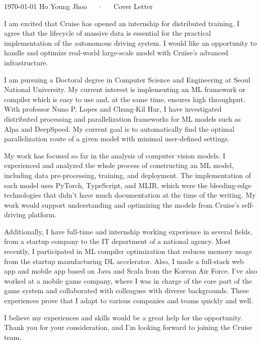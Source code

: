 \documentclass[11pt, a4paper]{awesome-cv}
\begin{document}
\makecvheader[L]

\makecvfooter
{\today}
{Ho Young Jhoo~~~·~~~Cover Letter}
{}

\makelettertitle

\begin{cvletter}

  I am excited that Cruise has opened an internship for distributed training. I agree that the lifecycle of massive data is essential for the practical implementation of the autonomous driving system. I would like an opportunity to handle and optimize real-world large-scale model with Cruise's advanced infrastructure.

  I am pursuing a Doctoral degree in Computer Science and Engineering at Seoul National University.
  My current interest is implementing an ML framework or compiler which is easy to use and, at the same time, ensures high throughput. With professor Nuno P. Lopes and Chung-Kil Hur, I have investigated distributed processing and parallelization frameworks for ML models such as Alpa and DeepSpeed. My current goal is to automatically find the optimal parallelization route of a given model with minimal user-defined settings.

  My work has focused so far in the analysis of computer vision models. I experienced and analyzed the whole process of constructing an ML model, including data pre-processing, training, and deployment. The implementation of each model uses PyTorch, TypeScript, and MLIR, which were the bleeding-edge technologies that didn't have much documentation at the time of the writing. My work would support understanding and optimizing the models from Cruise's self-driving platform.

  Additionally, I have full-time and internship working experience in several fields, from a startup company to the IT department of a national agency. Most recently, I participated in ML compiler optimization that reduces memory usage from the startup manufacturing DL accelerator. Also, I made a full-stack web app and mobile app based on Java and Scala from the Korean Air Force. I've also worked at a mobile game company, where I was in charge of the core part of the game system and collaborated with colleagues with diverse backgrounds. These experiences prove that I adapt to various companies and teams quickly and well.

  I believe my experiences and skills would be a great help for the opportunity. Thank you for your consideration, and I'm looking forward to joining the Cruise team.

\end{cvletter}


\makeletterclosing
\end{document}
